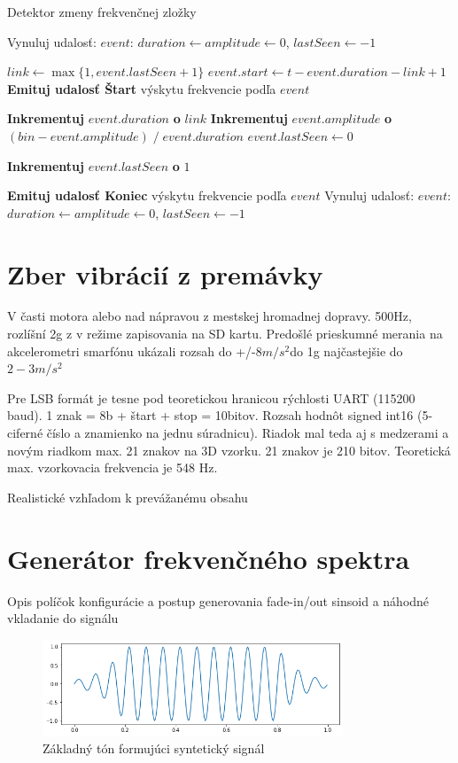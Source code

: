 \begin{algorithm}[h]
\caption{Detektor zmeny frekvenčnej zložky}
\begin{algorithmic}[1]
	\State Vynuluj udalosť: $event$: $duration \gets amplitude \gets 0$, $lastSeen \gets -1$
\EndIf

	\State $link \gets \max\{1, event.lastSeen + 1\}$
		\State $event.start \gets t - event.duration - link + 1$
		\State \textbf{Emituj udalosť Štart} výskytu frekvencie podľa $event$
	\EndIf
	
	\State \textbf{Inkrementuj} $event.duration$ \textbf{o} $link$
	\State \textbf{Inkrementuj} $event.amplitude$ \textbf{o} $(bin - event.amplitude)\;/\;event.duration$
	\State $event.lastSeen \gets 0$

	\State \textbf{Inkrementuj} $event.lastSeen$ \textbf{o}  $1$

        		\State \textbf{Emituj udalosť Koniec} výskytu frekvencie podľa $event$
        	\EndIf
        \Else
        	\State Vynuluj udalosť: $event$: $duration \gets amplitude \gets 0$, $lastSeen \gets -1$
        \EndIf
\EndIf
\end{algorithmic}
\label{algo:event-detector}
\end{algorithm}

\section{Zber vibrácií z premávky}
V časti motora alebo nad nápravou z mestskej hromadnej dopravy. 500Hz, rozlíšní 2g z v režime zapisovania na SD kartu.
Predošlé prieskumné merania na akcelerometri smarfónu ukázali rozsah do +/-$8 m/s^2$do 1g najčastejšie do $2 - 3 m/s^2$

Pre LSB formát je tesne pod teoretickou hranicou rýchlosti UART (115200 baud). 1 znak = 8b + štart + stop = 10bitov.
Rozsah hodnôt signed int16 (5-ciferné číslo a znamienko na jednu súradnicu). Riadok mal teda aj s medzerami a novým riadkom max.
21 znakov na 3D vzorku. 21 znakov je 210 bitov. Teoretická max. vzorkovacia frekvencia je 548 Hz.

Realistické vzhľadom k prevážanému obsahu

\section{Generátor frekvenčného spektra}
Opis políčok konfigurácie a postup generovania fade-in/out sinsoid a náhodné vkladanie do signálu

\begin{figure}[h]
   \centering
    \includegraphics[width=0.8\textwidth]{figures/verification/fade-in-sinusoid.png}
   \caption{Základný tón formujúci syntetický signál}
\end{figure} 

